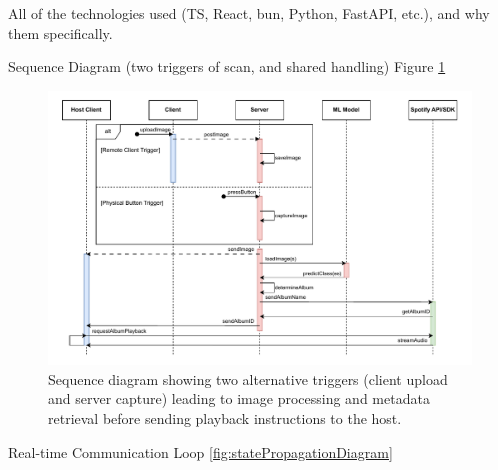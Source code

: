             \begin{temp}
                All of the technologies used (TS, React, bun, Python, FastAPI, etc.), and why them specifically.
            \end{temp}
    
            \begin{temp}
                Sequence Diagram (two triggers of scan, and shared handling) Figure \ref{fig:imageSequenceDiagram}
            \end{temp}
    
            \begin{figure}[h]
                \centering
                \includegraphics[width=\textwidth]{images/VTT_imageScan.SequenceDiagram.pdf}
                \caption{Sequence diagram showing two alternative triggers (client upload and server capture) leading to image processing and metadata retrieval before sending playback instructions to the host.}
                \label{fig:imageSequenceDiagram}
            \end{figure}
    
            \begin{temp}
                Real-time Communication Loop \ref{fig:statePropagationDiagram}
            \end{temp}
    
